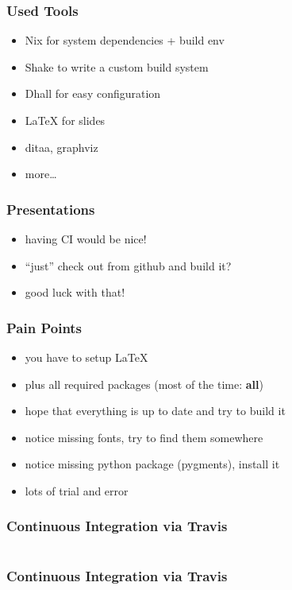 \documentclass{beamer}
\begin{document}
\begin{frame}
  \frametitle{Used Tools}
  \begin{itemize}
  \item Nix for system dependencies + build env
  \item Shake to write a custom build system
  \item Dhall for easy configuration
  \item LaTeX for slides
  \item ditaa, graphviz
  \item more\ldots
  \end{itemize}
\end{frame}

\begin{frame}
  \frametitle{Presentations}
  \begin{itemize}
  \item having CI would be nice!
  \item ``just'' check out from github and build it?
  \item good luck with that!
  \end{itemize}
\end{frame}

\begin{frame}
  \frametitle{Pain Points}
  \begin{itemize}
  \item you have to setup LaTeX
  \item plus all required packages (most of the time: \textbf{all})
  \item hope that everything is up to date and try to build it
  \item notice missing fonts, try to find them somewhere
  \item notice missing python package (pygments), install it
  \item lots of trial and error
  \end{itemize}
\end{frame}

\begin{frame}
  \frametitle{Continuous Integration via Travis}
  \inputminted[linenos=false, fontsize=\tiny, lastline=31]{yaml}{static-source/long-travis-ci.yml}
\end{frame}

\begin{frame}
  \frametitle{Continuous Integration via Travis}
  \inputminted[linenos=false, fontsize=\tiny, firstline=31, lastline=60]{yaml}{static-source/long-travis-ci.yml}
\end{frame}
\end{document}
